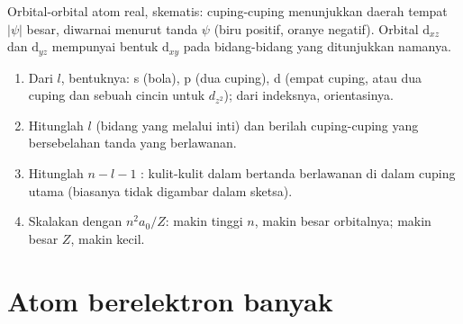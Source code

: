 \begin{omfigure}

{\small Orbital-orbital atom real, skematis: cuping-cuping menunjukkan
daerah tempat $|\psi|$ besar, diwarnai menurut tanda $\psi$ (biru positif,
oranye negatif). Orbital $\mathrm d_{xz}$ dan $\mathrm d_{yz}$ mempunyai
bentuk $\mathrm d_{xy}$ pada bidang-bidang yang ditunjukkan namanya.}
\end{omfigure}

\begin{method}\label{met:b2:atomic-orbitals:draw-orbital}
\begin{enumerate}
  \item Dari $l$, bentuknya: s (bola), p (dua cuping), d (empat cuping, atau
        dua cuping dan sebuah cincin untuk $d_{z^2}$); dari indeksnya,
        orientasinya.
  \item Hitunglah $l$  (bidang yang melalui inti) dan berilah
        cuping-cuping yang bersebelahan tanda yang berlawanan.
  \item Hitunglah $n - l - 1$ : kulit-kulit dalam bertanda
        berlawanan di dalam cuping utama (biasanya tidak digambar dalam
        sketsa).
  \item Skalakan dengan $n^2a_0/Z$: makin tinggi $n$, makin besar
        orbitalnya; makin besar $Z$, makin kecil.
\end{enumerate}
\end{method}

\section{Atom berelektron banyak}

